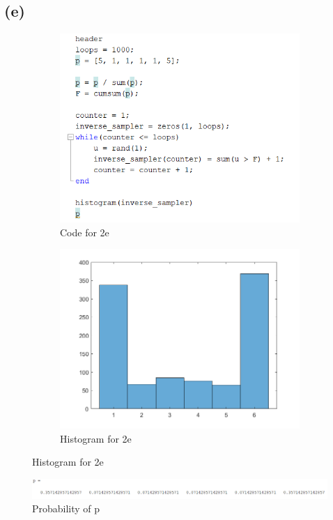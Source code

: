 \documentclass{article}
\begin{document}
\subsection{(e)}
\begin{figure}[H]
    \begin{subfigure}[h]{0.45\linewidth}
        \includegraphics[width=\linewidth]{imgs/q2e_code.png}
        \caption{Code for 2e}
    \end{subfigure}
    \hfill
    \begin{subfigure}[h]{0.45\linewidth}
        \includegraphics[width=\linewidth]{imgs/q2e_histogram.png}
        \caption{Histogram for 2e}
    \end{subfigure}
\end{figure}
    \begin{figure}[h]
        \includegraphics[width=\linewidth]{imgs/q2e_p.png}
        \caption{Probability of p}
    \end{figure}
    \hfill
\end{document}
